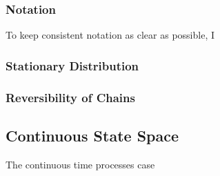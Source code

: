 \documentclass[a4paper,11pt,english]{article}
\begin{document}
			\subsubsection{Notation}
			
			To keep consistent notation as clear as possible, I 


			\subsubsection{Stationary Distribution}


			\subsubsection{Reversibility of Chains}



			
		\subsection{Continuous State Space} 

		The continuous time processes case
		

\end{document}
